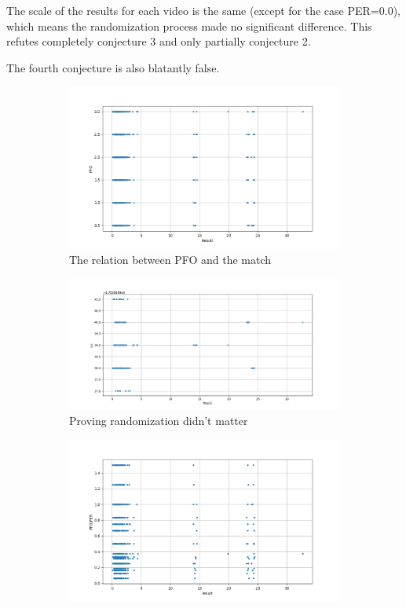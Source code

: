 \documentclass[]{article}
\begin{document}
The scale of the results for each video is the same (except for the case PER=0.0), which means the randomization process made no significant difference. This refutes completely conjecture 3 and only partially conjecture 2.

The fourth conjecture is also blatantly false.

\begin{figure}[h] %
	\centering
	\begin{subfigure}{0.45\textwidth}
		\centering
		\includegraphics[width=\textwidth]{QueryPFO.png}
		\caption{The relation between PFO and the match}
		\label{graphs:pfo}
	\end{subfigure}
	\hfill
	\begin{subfigure}{0.45\textwidth}
		\centering
		\includegraphics[width=\textwidth]{QueryScaleOfMatch.png}
		\caption{Proving randomization didn't matter}
		\label{graphs:random}
	\end{subfigure}
	\vfill
	\begin{subfigure}{0.45\textwidth}
		\centering
		\includegraphics[width=\textwidth]{QueryRatio.png}

\end{subfigure}
\end{figure}
\end{document}

